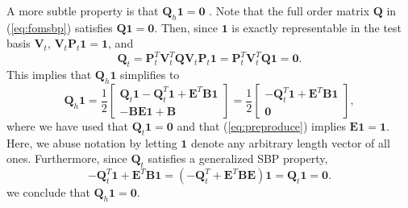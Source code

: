 \documentclass[preprint,10pt]{elsarticle}
\theoremstyle{definition}
\theoremstyle{lemma}
\theoremstyle{theorem}
\theoremstyle{assumption}
\newcommand{\LRp}[1]{\left( #1 \right)}
\begin{document}
A more subtle property is that $\bm{Q}_h\bm{1} = \bm{0}$ \cite{chan2019skew}.  Note that the full order matrix $\bm{Q}$ in (\ref{eq:fomsbp}) satisfies $\bm{Q}\bm{1} = \bm{0}$.  Then, since $\bm{1}$ is exactly representable in the test basis $\bm{V}_t$, $\bm{V}_t\bm{P}_t\bm{1} = \bm{1}$, and
\[
\bm{Q}_t = \bm{P}_t^T\bm{V}_t^T\bm{Q}\bm{V}_t\bm{P}_t\bm{1} = \bm{P}_t^T\bm{V}_t^T\bm{Q}\bm{1} = \bm{0}.
\]
This implies that $\bm{Q}_h\bm{1}$ simplifies to
\[
\bm{Q}_h \bm{1} =  \frac{1}{2}\begin{bmatrix}
\bm{Q}_t \bm{1} - \bm{Q}_t^T \bm{1} + \bm{E}^T\bm{B} \bm{1} \\
- \bm{B}\bm{E} \bm{1} + \bm{B}
\end{bmatrix}=\frac{1}{2}\begin{bmatrix}
- \bm{Q}_t^T \bm{1} + \bm{E}^T\bm{B} \bm{1} \\
\bm{0}
\end{bmatrix},
\]
where we have used that $\bm{Q}_t\bm{1} = \bm{0}$ and that (\ref{eq:preproduce}) implies $\bm{E}\bm{1} = \bm{1}$.   Here, we abuse notation by letting $\bm{1}$ denote any arbitrary length vector of all ones.  Furthermore, since $\bm{Q}_t$ satisfies a generalized SBP property,
\[
- \bm{Q}_t^T \bm{1} + \bm{E}^T\bm{B} \bm{1} = \LRp{-\bm{Q}_t^T + \bm{E}^T\bm{B}\bm{E}} \bm{1} = \bm{Q}_t \bm{1} = \bm{0}.
\]
we conclude that $\bm{Q}_h\bm{1} = \bm{0}$.
\end{document}
